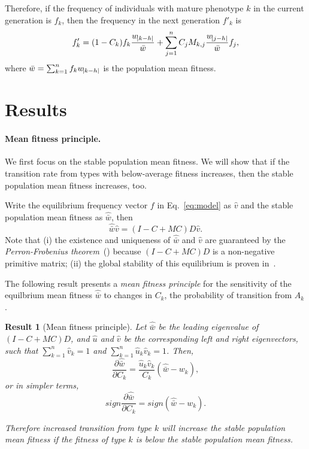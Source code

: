 \documentclass[9pt, a4paper, twocolumn]{extarticle}
\newtheorem{result}{Result}
\begin{document}
Therefore, if the frequency of individuals with mature phenotype $k$ in the current generation is $f_k$, then the frequency in the next generation $f'_k$ is
\begin{equation}
f'_k = (1-C_k) f_k \frac{w_{\abs{k-h}}}{\bar{w}} + \sum_{j=1}^{n}{C_j M_{k,j} \frac{w_{\abs{j-h}}}{\bar{w}} f_j },
\end{equation}
where $\bar{w} = \sum_{k=1}^{n}{f_k w_{\abs{k-h}}}$ is the population mean fitness.

\section*{Results}

\paragraph*{Mean fitness principle.}

We first focus on the stable population mean fitness.
We will show that if the transition rate from types with below-average fitness increases, then the stable population mean fitness increases, too.

Write the equilibrium  frequency vector $f$ in Eq.~\ref{eq:model} as $\hat v$ and the stable population mean fitness as $\hat{\bar w}$, then
\begin{equation}\label{eq:model_equilibrium}
\hat{\bar w} \hat v = (I-C+MC)D \hat v.
\end{equation}
Note that (i) the existence and uniqueness of $\hat{\bar w}$ and $\hat v$ are guaranteed by the \emph{Perron-Frobenius theorem}~(\cite{Otto2007}) because $(I-C+MC)D$ is a non-negative primitive matrix; 
(ii) the global stability of this equilibrium is proven in~.

The following result presents a \emph{mean fitness principle} for the
sensitivity of the equilbrium mean fitness $\hat{\bar w}$ to changes
in $C_k$, the probability of transition from $A_k$.
\medskip

\begin{result}[Mean fitness principle]\label{result:mfp}
Let $\hat{\bar w}$ be the leading eigenvalue of $(I-C+MC)D$,
and $\hat u$ and $\hat v$ be the corresponding left and right eigenvectors, such that $\sum_{k=1}^{n}\hat v_k=1$ and $\sum_{k=1}^{n}\hat u_k\hat v_k=1$.
Then,
\begin{equation}\label{eq:mfp}
\frac{\partial \hat{\bar w}}{\partial C_k} = 
\frac{\hat u_k \hat v_k}{C_k} (\hat{\bar w} - w_k),
\end{equation}
or in simpler terms,
\begin{equation}\label{eq:mfp_sign}
sign\frac{\partial \hat{\bar w}}{\partial C_k} = 
sign(\hat{\bar w} - w_k).
\end{equation}

Therefore increased transition from type $k$ will increase the stable population mean fitness if the fitness of type $k$ is below the stable population mean fitness.
\end{result}
\end{document}
